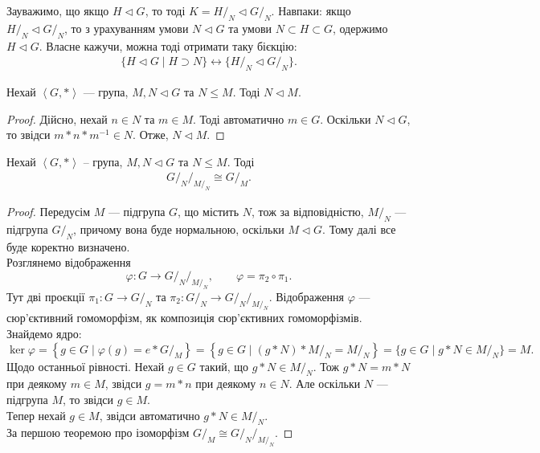 \documentclass{math_library}
\begin{document}
\begin{remark}
Зауважимо, що якщо $H \triangleleft G$, то тоді $K = H/_N \triangleleft G/_N$. Навпаки: якщо $H/_N \triangleleft G/_N$, то з урахуванням умови $N \triangleleft G$ та умови $N \subset H \subset G$, одержимо $H \triangleleft G$. Власне кажучи, можна тоді отримати таку бієкцію:
\begin{align*}
\{  H \triangleleft G \mid H \supset N \} \longleftrightarrow \{ H/_N \triangleleft G/_N \}.
\end{align*}
\end{remark}

\begin{lemma}
Нехай $\left< G, *\right>$ --- група, $M,N \triangleleft G$ та $N \leq M$. Тоді $N \triangleleft M$.
\end{lemma}

\begin{proof}
Дійсно, нехай $n \in N$ та $m \in M$. Тоді автоматично $m \in G$. Оскільки $N \triangleleft G$, то звідси $m*n*m^{-1} \in N$. Отже, $N \triangleleft M$.
\end{proof}

\begin{theorem}
Нехай $\left< G, *\right>$ -- група, $M,N \triangleleft G$ та $N \leq M$. Тоді
\begin{align*}
{G/_N}/_{M/_N} \cong G/_M.
\end{align*}
\end{theorem}

\begin{proof}
Передусім $M$ --- підгрупа $G$, що містить $N$, тож за відповідністю, $M/_N$ --- підгрупа $G/_N$, причому вона буде нормальною, оскільки $M \triangleleft G$. Тому далі все буде коректно визначено.\\
Розглянемо відображення 
\[
\varphi \colon G \to {G/_N}/_{M/_N}, \qquad \varphi = \pi_2 \circ \pi_1. 
\]
Тут дві проєкції $\pi_1 \colon G \to G/_N$ та $\pi_2 \colon G/_N \to {G/_N}/_{M/_N}$. Відображення $\varphi$ --- сюр'єктивний гомоморфізм, як композиція сюр'єктивних гомоморфізмів. Знайдемо ядро:
\[
\ker \varphi = \left\{g \in G \mid \varphi(g) = e*G/_M \right\} = \left\{ g \in G \mid (g*N)*M/_N = M/_N \right\} = \{g \in G \mid g*N \in M/_N\} = M.
\]
Щодо останньої рівності. Нехай $g \in G$ такий, що $g*N \in M/_N$. Тож $g*N = m*N$ при деякому $m \in M$, звідси $g = m*n$ при деякому $n \in N$. Але оскільки $N$ --- підгрупа $M$, то звідси $g \in M$.\\
Тепер нехай $g \in M$, звідси автоматично $g*N \in M/_N$.\\
За першою теоремою про ізоморфізм $G/_M \cong {G/_N}/_{M/_N}$.
\end{proof}
\end{document}
